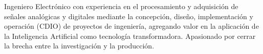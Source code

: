 %
%
%
\par{

Ingeniero Electrónico con experiencia en el procesamiento y adquisición de señales analógicas y digitales mediante la concepción, diseño, implementación y operación (CDIO) de proyectos de ingeniería, agregando valor en la aplicación de la Inteligencia Artificial como tecnología transformadora. Apasionado por cerrar la brecha entre la investigación y la producción.




}
